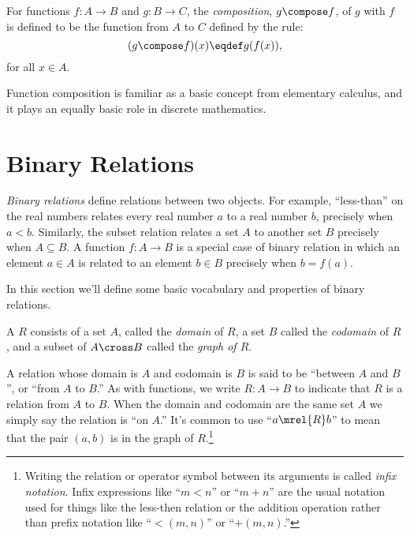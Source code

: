 \begin{definition}\label{func_compose_def}
  For functions $f:A \to B$ and $g:B \to C$, the \emph{composition},
  $g \compose f$, of $g$ with $f$ is defined to be the function
  from $A$ to $C$ defined by the rule:
\begin{displaymath}
(g \compose f)(x) \eqdef g(f(x)),
\end{displaymath}
for all $x \in A$.
\end{definition}

Function composition is familiar as a basic concept from elementary
calculus, and it plays an equally basic role in discrete mathematics.

\section{Binary Relations}\label{rel_sec}

\emph{Binary relations} define relations between two objects.  For
example, ``less-than'' on the real numbers relates every real number $a$
to a real number $b$, precisely when $a < b$.  Similarly, the subset
relation relates a set $A$ to another set $B$ precisely when $A
\subseteq B$.  A function $f:A \to B$ is a special case of binary relation
in which an element $a \in A$ is related to an element $b \in B$ precisely
when $b = f(a)$.

In this section we'll define some basic vocabulary and properties of binary
relations.

\begin{definition}\label{reldef}
A %
$R$ consists of a set $A$, called the
\emph{domain}%
of $R$, a set $B$ called the
\emph{codomain}%
of $R$, and a subset of $A \cross B$ called the
\emph{graph of $R$}.
\end{definition}

A relation whose domain is $A$ and codomain is $B$ is said to be
``between $A$ and $B$'', or ``from $A$ to $B$.''  As with functions,
we write $R: A \to B$ to indicate that $R$ is a relation from $A$ to
$B$.  When the domain and codomain are the same set $A$ we simply
say the%
%
relation is ``on $A$.''  It's common
to use ``$a \mrel{R} b$'' to mean that the pair $(a,b)$ is in the
graph of $R$.\footnote{Writing the relation or operator symbol between
  its arguments is called \emph{infix notation}.  Infix expressions
  like ``$m < n$'' or ``$m + n$'' are the usual notation used for
  things like the less-then relation or the addition operation rather
  than {prefix notation} like ``$<(m,n)$'' or ``$+(m,n)$.''}

